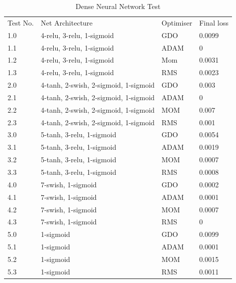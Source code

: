 \begin{table}[H]
\centering
    \begin{tabular}{|p{1cm}|p{5cm}|p{2cm}|p{2cm}|}
        \hline
        Test No. & Net Architecture & Optimiser & Final loss\\ \cline{1-4} 
        1.0 & 4-relu, 3-relu, 1-sigmoid & GDO & 0.0099\\ \cline{1-4}
        1.1 & 4-relu, 3-relu, 1-sigmoid & ADAM & 0 \\ \cline{1-4}
        1.2 & 4-relu, 3-relu, 1-sigmoid & Mom & 0.0031 \\ \cline{1-4}
        1.3 & 4-relu, 3-relu, 1-sigmoid & RMS & 0.0023 \\ \cline{1-4}
        
        2.0 & 4-tanh, 2-swish, 2-sigmoid, 1-sigmoid & GDO & 0.003 \\ \cline{1-4}
        2.1 & 4-tanh, 2-swish, 2-sigmoid, 1-sigmoid & ADAM & 0 \\ \cline{1-4}
        2.2 & 4-tanh, 2-swish, 2-sigmoid, 1-sigmoid & MOM & 0.007 \\ \cline{1-4}
        2.3 & 4-tanh, 2-swish, 2-sigmoid, 1-sigmoid & RMS & 0.001 \\ \cline{1-4}
        
        3.0 & 5-tanh, 3-relu, 1-sigmoid & GDO & 0.0054 \\ \cline{1-4}
        3.1 & 5-tanh, 3-relu, 1-sigmoid & ADAM & 0.0019 \\ \cline{1-4}
        3.2 & 5-tanh, 3-relu, 1-sigmoid & MOM & 0.0007 \\ \cline{1-4}
        3.3 & 5-tanh, 3-relu, 1-sigmoid & RMS & 0.0008 \\ \cline{1-4}
        
        4.0 & 7-swish, 1-sigmoid & GDO & 0.0002 \\ \cline{1-4}
        4.1 & 7-swish, 1-sigmoid & ADAM & 0.0001 \\ \cline{1-4}
        4.2 & 7-swish, 1-sigmoid & MOM & 0.0007 \\ \cline{1-4}
        4.3 & 7-swish, 1-sigmoid & RMS & 0 \\ \cline{1-4}
        
        5.0 & 1-sigmoid & GDO & 0.0099 \\ \cline{1-4}
        5.1 & 1-sigmoid & ADAM & 0.0001 \\ \cline{1-4}
        5.2 & 1-sigmoid & MOM & 0.0015 \\ \cline{1-4}
        5.3 & 1-sigmoid & RMS & 0.0011 \\ \cline{1-4}
    \end{tabular}
    \caption{Dense Neural Network Test}
\end{table}
